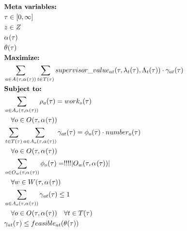 \begin{alignat}{2}
	& \textbf{Meta variables:} \notag\\
	& \tau \in [0, \infty] \notag\\
	& \ElementSupervisor \in \SetSupervisor \notag\\
	& \VarStrategicWorkOrderAssignment{}{} \notag\\
	& \VarIncludeActivity{} \notag\\
	& \textbf{Maximize:} \notag\\
	& \sum_{\ElementActivity \in \SetActivity{\VarStrategicWorkOrderAssignment{}{}}{}} \sum_{\ElementTechnician \in \SetTechnician} \ParSupervisorValue \cdot \VarSupervisorAssignment{\ElementActivity}{\ElementTechnician} \\ 
	& \textbf{Subject to:} \notag\\ 
	& \sum_{\ElementActivity \in \SetActivity{\VarStrategicWorkOrderAssignment{}{}}{\ElementOperation}} \VarActivityWork{\ElementActivity} = \ParOperationWork{\ElementOperation}   \notag\\
	& \quad \forall \ElementOperation \in \SetOperation{}{\VarStrategicWorkOrderAssignment{}{}}\\
	& \sum_{\ElementTechnician \in \SetTechnician} \sum_{\ElementActivity \in \SetActivity{\VarStrategicWorkOrderAssignment{}{}}{\ElementOperation}}\VarSupervisorAssignment{\ElementActivity}{\ElementTechnician} = \VarSupervisorAssignmentWhole \cdot \ParNumberOfPeople \notag\\
	& \quad \forall \ElementOperation \in \SetOperation{}{\VarStrategicWorkOrderAssignment{}{}}  \\
	& \sum_{\ElementOperation \in \SetOperation{\ElementWorkOrder}{\VarStrategicWorkOrderAssignment{}{}}} \VarSupervisorAssignmentWhole = !!!! |\SetOperation{\ElementWorkOrder}{\VarStrategicWorkOrderAssignment{}{}}| \notag\\ 
	& \quad \forall \ElementWorkOrder \in \SetWorkOrder{,\VarStrategicWorkOrderAssignment{}{}} \\
	& \sum_{\ElementActivity \in \SetActivity{\VarStrategicWorkOrderAssignment{}{}}{\ElementOperation}} \VarSupervisorAssignment{\ElementActivity}{\ElementTechnician} \leq 1 \notag\\
	& \quad \forall \ElementOperation \in \SetOperation{}{\VarStrategicWorkOrderAssignment{}{}} \quad \forall \ElementTechnician \in \SetTechnician \\  
	& \VarSupervisorAssignment{\ElementActivity}{\ElementTechnician} \leq \ParFeasible \notag\\

\end{alignat}
